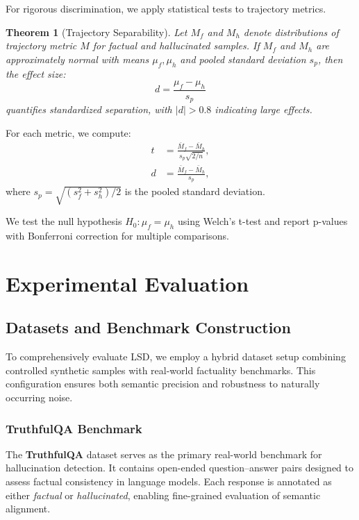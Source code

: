 \documentclass[11pt]{article}
\newtheorem{theorem}{Theorem}
\begin{document}
For rigorous discrimination, we apply statistical tests to trajectory metrics.

\begin{theorem}[Trajectory Separability]
Let $M_f$ and $M_h$ denote distributions of trajectory metric $M$ for factual and hallucinated samples. If $M_f$ and $M_h$ are approximately normal with means $\mu_f, \mu_h$ and pooled standard deviation $s_p$, then the effect size:
\[
d = \frac{\mu_f - \mu_h}{s_p}
\]
quantifies standardized separation, with $|d| > 0.8$ indicating large effects.
\end{theorem}

For each metric, we compute:
\begin{align}
t &= \frac{\bar{M}_f - \bar{M}_h}{s_p \sqrt{2/n}}, \label{eq:ttest} \\
d &= \frac{\bar{M}_f - \bar{M}_h}{s_p}, \label{eq:cohens_d}
\end{align}
where $s_p = \sqrt{(s_f^2 + s_h^2)/2}$ is the pooled standard deviation.

We test the null hypothesis $H_0: \mu_f = \mu_h$ using Welch's t-test and report p-values with Bonferroni correction for multiple comparisons.

\section{Experimental Evaluation}
\label{sec:experiments}

\subsection{Datasets and Benchmark Construction}

To comprehensively evaluate LSD, we employ a hybrid dataset setup combining controlled synthetic samples with real-world factuality benchmarks. This configuration ensures both semantic precision and robustness to naturally occurring noise.

\subsubsection{TruthfulQA Benchmark}

The \textbf{TruthfulQA} dataset serves as the primary real-world benchmark for hallucination detection. It contains open-ended question–answer pairs designed to assess factual consistency in language models. Each response is annotated as either \emph{factual} or \emph{hallucinated}, enabling fine-grained evaluation of semantic alignment. 
\end{document}
